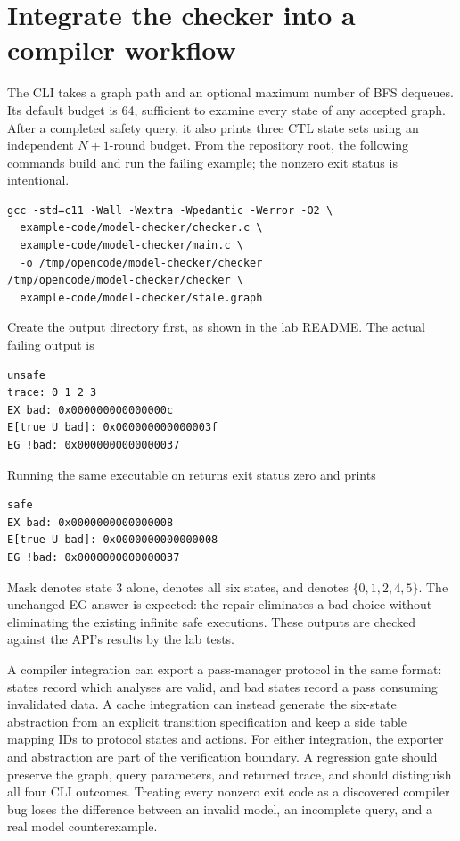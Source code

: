 \section{Integrate the checker into a compiler workflow}
\label{sec:ch48-integration}

The CLI takes a graph path and an optional maximum number of BFS dequeues.
Its default budget is 64, sufficient to examine every state of any accepted graph.
After a completed safety query, it also prints three CTL state sets using an independent $N+1$-round budget.
From the repository root, the following commands build and run the failing example; the nonzero exit status is intentional.

\begin{verbatim}
gcc -std=c11 -Wall -Wextra -Wpedantic -Werror -O2 \
  example-code/model-checker/checker.c \
  example-code/model-checker/main.c \
  -o /tmp/opencode/model-checker/checker
/tmp/opencode/model-checker/checker \
  example-code/model-checker/stale.graph
\end{verbatim}

Create the output directory first, as shown in the lab README.
The actual failing output is
\begin{verbatim}
unsafe
trace: 0 1 2 3
EX bad: 0x000000000000000c
E[true U bad]: 0x000000000000003f
EG !bad: 0x0000000000000037
\end{verbatim}
Running the same executable on  returns exit status zero and prints
\begin{verbatim}
safe
EX bad: 0x0000000000000008
E[true U bad]: 0x0000000000000008
EG !bad: 0x0000000000000037
\end{verbatim}
Mask \code{0x8} denotes state 3 alone,  denotes all six states, and  denotes $\{0,1,2,4,5\}$.
The unchanged EG answer is expected: the repair eliminates a bad choice without eliminating the existing infinite safe executions.
These outputs are checked against the API's results by the lab tests.

A compiler integration can export a pass-manager protocol in the same format: states record which analyses are valid, and bad states record a pass consuming invalidated data.
A cache integration can instead generate the six-state abstraction from an explicit transition specification and keep a side table mapping IDs to protocol states and actions.
For either integration, the exporter and abstraction are part of the verification boundary.
A regression gate should preserve the graph, query parameters, and returned trace, and should distinguish all four CLI outcomes.
Treating every nonzero exit code as a discovered compiler bug loses the difference between an invalid model, an incomplete query, and a real model counterexample.

